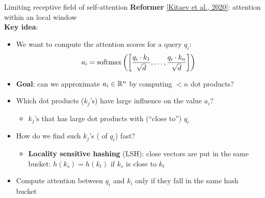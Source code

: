 \documentclass[usenames,dvipsnames,notes,11pt,aspectratio=169,hyperref={colorlinks=true, linkcolor=blue}]{beamer}
\begin{document}
\begin{frame}
    {Limiting receptive field of self-attention}
    \textbf{Reformer} \href{https://arxiv.org/pdf/2001.04451.pdf}{[Kitaev et al., 2020]}: attention within an  local window\\[1ex]

    \textbf{Key idea}:\\
    \begin{itemize}[<+->]
        \item We want to compute the attention scores for a query $q_i$:
            $$
            a_i = \mathrm{softmax}\left( \left[ \frac{q_i\cdot k_1}{\sqrt{d}},\ldots,\frac{q_i\cdot k_n}{\sqrt{d}} \right] \right)
            $$
        \item \textbf{Goal}: can we approximate $a_i \in \mathbb{R}^n$ by computing $<n$ dot products?
        \item Which dot products ($k_j$'s) have large influence on the value $a_i$?
            \begin{itemize}
                \item $k_j$'s that has large dot products with (``close to'') $q_i$
            \end{itemize}
        \item How do we find such $k_j$'s ( of $q_i$) fast?
            \begin{itemize}
                \item \textbf{Locality sensitive hashing} (LSH): close vectors are put in the same bucket: $h(k_s) = h(k_t)$ if $k_s$ is close to $k_t$
            \end{itemize}
        \item Compute attention between $q_i$ and $k_i$ only if they fall in the same hash bucket
    \end{itemize}
\end{frame}
\end{document}
